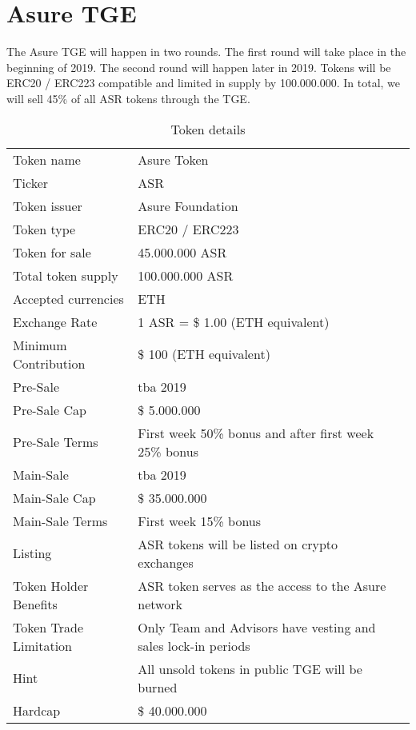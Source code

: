 \section{Asure TGE}

The Asure TGE will happen in two rounds. The first round will take place in the beginning of 2019. The second round will happen later in 2019. Tokens will be ERC20 / ERC223 compatible and limited in supply by 100.000.000. In total, we will sell 45\% of all ASR tokens through the TGE. 

\begin{table}[H]
\begin{tabular}{lp{}l}
  Token name & Asure Token \\  
  Ticker & ASR\\
  Token issuer & Asure Foundation\\
  Token type & ERC20 / ERC223 \\
  Token for sale & 45.000.000 ASR \\
  Total token supply & 100.000.000 ASR \\
  Accepted currencies & ETH \\
  Exchange Rate & 1 ASR = \$ 1.00 (ETH equivalent) \\
  Minimum Contribution & \$ 100 (ETH equivalent) \\\hline  
  
  Pre-Sale & tba 2019 \\
  Pre-Sale Cap & \$ 5.000.000 \\
  Pre-Sale Terms & First week 50\% bonus and after first week 25\% bonus \\\hline
  Main-Sale & tba 2019 \\  
  Main-Sale Cap & \$ 35.000.000 \\
  Main-Sale Terms & First week 15\% bonus \\\hline

  Listing & ASR tokens will be listed on crypto exchanges \\
  Token Holder Benefits & ASR token serves as the access to the Asure network \\
  Token Trade Limitation & Only Team and Advisors have vesting and sales lock-in periods \\
  Hint & All unsold tokens in public TGE  will be burned \\\hline  
  
  Hardcap & \$ 40.000.000
  
\end{tabular}
\caption{\label{tab:table-name}Token details}
\end{table}

